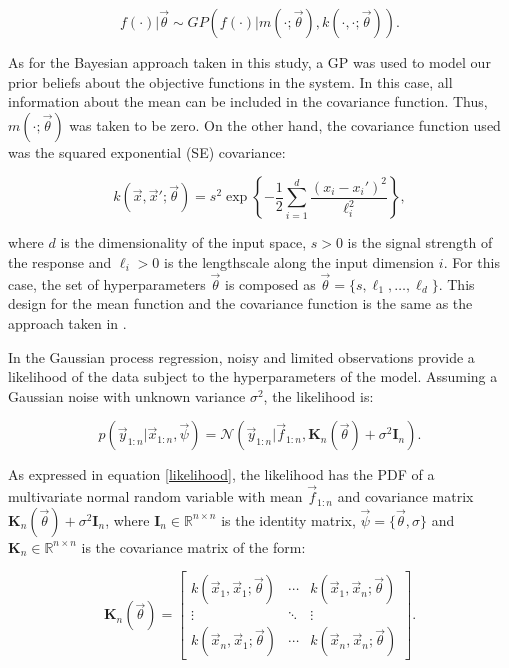 \documentclass{article}
\begin{document}
\begin{equation}
    f(\cdot)|\vec{\theta} \sim GP(f(\cdot)|m(\cdot;\vec{\theta}),k(\cdot,\cdot;\vec{\theta})).
\end{equation}

As for the Bayesian approach taken in this study, a GP was used to model our prior beliefs about the objective functions in the system. In this case, all information about the mean can be included in the covariance function. Thus, $m(\cdot;\vec{\theta})$ was taken to be zero. On the other hand, the covariance function used was the squared exponential (SE) covariance:

\begin{equation}
    k(\vec{x},\vec{x}';\vec{\theta}) = s^2 \exp \left \{ -\frac{1}{2}\sum_{i=1}^{d}\frac{(x_i - x_i')^2}{\ell_i^2} \right \},
\end{equation}

where $d$ is the dimensionality of the input space, $s > 0$ is the signal strength of the response and $\ell_i > 0$ is the lengthscale along the input dimension $i$. For this case, the set of hyperparameters $\vec{\theta}$ is composed as $\vec{\theta} = \{s, \ell_1, \ldots, \ell_d\}$. This design for the mean function and the covariance function is the same as the approach taken in \cite{Pandita2016}.

In the Gaussian process regression, noisy and limited observations provide a likelihood of the data subject to the hyperparameters of the model. Assuming a Gaussian noise with unknown variance $\sigma^2$, the likelihood is\cite{Pandita2016}:

\begin{equation}
    p(\vec{y}_{1:n}|\vec{x}_{1:n}, \vec{\psi}) = \mathcal{N}(\vec{y}_{1:n}|\vec{f}_{1:n},\textbf{K}_n(\vec{\theta}) + \sigma^2\textbf{I}_n).
    \label{likelihood}
\end{equation}

As expressed in equation \ref{likelihood}, the likelihood has the PDF of a multivariate normal random variable with mean $\vec{f}_{1:n}$ and covariance matrix $\textbf{K}_n(\vec{\theta}) + \sigma^2\textbf{I}_n$, where $\textbf{I}_n \in \mathbb{R}^{n\times n}$ is the identity matrix, $\vec{\psi} = \{ \vec{\theta}, \sigma \} $ and $\textbf{K}_n \in \mathbb{R}^{n\times n}$ is the covariance matrix of the form:

\begin{equation}
    \textbf{K}_n(\vec{\theta}) =
    \begin{bmatrix}
        k(\vec{x}_1,\vec{x}_1;\vec{\theta}) & \cdots & k(\vec{x}_1,\vec{x}_n;\vec{\theta}) \\
        \vdots & \ddots & \vdots\\
        k(\vec{x}_n,\vec{x}_1;\vec{\theta}) & \cdots & k(\vec{x}_n,\vec{x}_n;\vec{\theta})
    \end{bmatrix}.
\end{equation}
\end{document}
